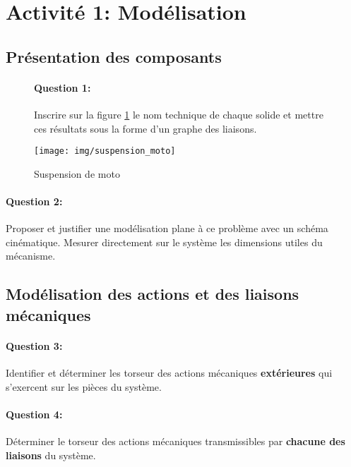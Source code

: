 

\section{Activité 1: Modélisation}

\subsection{Présentation des composants}

\begin{figure}[!h]
 \begin{minipage}{0.45\linewidth}
\paragraph{Question 1:} Inscrire sur la figure \ref{img1} le nom technique de chaque solide et mettre ces résultats sous la forme d'un graphe des liaisons.
 \end{minipage}
  \hfill
 \begin{minipage}{0.45\linewidth}
  \centering\texttt{[image: img/suspension\_moto]}
  \caption{Suspension de moto}
  \label{img1}
 \end{minipage}
\end{figure}

\paragraph{Question 2:} Proposer et justifier une modélisation plane à ce problème avec un schéma cinématique. Mesurer directement sur le système les dimensions utiles du mécanisme.

\vspace{6cm}

\subsection{Modélisation des actions et des liaisons mécaniques}

\paragraph{Question 3:} Identifier et déterminer les torseur des actions mécaniques \textbf{extérieures} qui s'exercent sur les pièces du système.



\paragraph{Question 4:} Déterminer le torseur des actions mécaniques transmissibles par \textbf{chacune des liaisons} du système.



